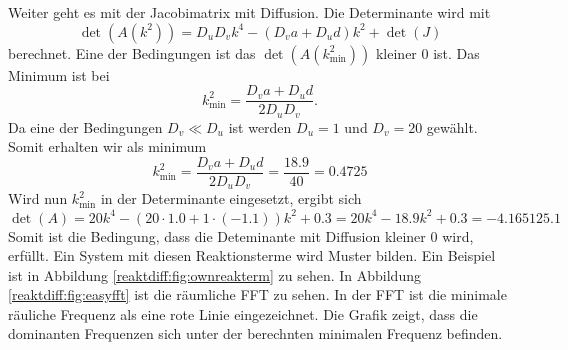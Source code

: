Weiter geht es mit der Jacobimatrix mit Diffusion.
Die Determinante wird mit
\begin{equation*}
    \det(A(k^2)) = D_u D_v k^4 - (D_v a + D_u d) k^2 + \det(J)
\end{equation*}
berechnet.
Eine der Bedingungen ist das \(\det(A(k_{\min}^2))\) kleiner 0 ist.
Das Minimum ist bei
\begin{equation*}
    k^2_{\text{min}} = \frac{D_v a + D_u d}{2 D_u D_v}.
\end{equation*}
Da eine der Bedingungen \(D_v \ll D_u\) ist werden \(D_u = 1\) und \(D_v = 20\) gewählt.
Somit erhalten wir als minimum
\begin{equation*}
    k^2_{\text{min}} = \frac{D_v a + D_u d}{2 D_u D_v} = \frac{18.9}{40} = 0.4725
\end{equation*}
Wird nun \(k^2_{\text{min}}\) in der Determinante eingesetzt, ergibt sich
\begin{equation}
    \det(A) = 20k^4 - (20 \cdot 1.0 + 1 \cdot (-1.1))k^2 + 0.3 = 20k^4 - 18.9k^2 + 0.3
     = -4.165125.1
\end{equation}
Somit ist die Bedingung, dass die Deteminante mit Diffusion kleiner 0 wird, erfüllt.
Ein System mit diesen Reaktionsterme wird Muster bilden.
Ein Beispiel ist in Abbildung \ref{reaktdiff:fig:ownreakterm} zu sehen.
In Abbildung \ref{reaktdiff:fig:easyfft} ist die räumliche FFT zu sehen.
In der FFT ist die minimale räuliche Frequenz als eine rote Linie eingezeichnet.
Die Grafik zeigt, dass die dominanten Frequenzen sich unter der berechnten minimalen Frequenz befinden.


